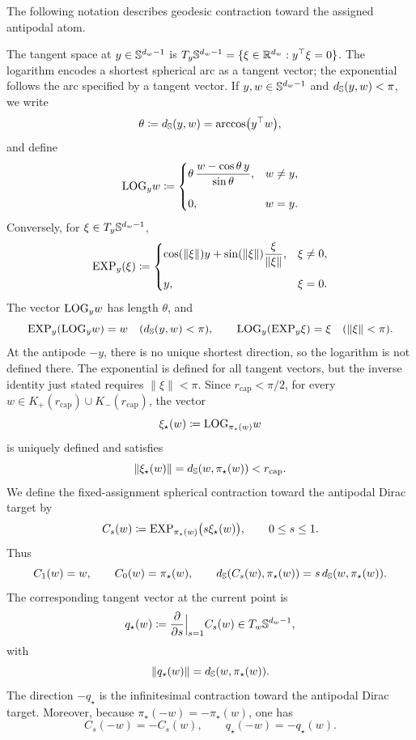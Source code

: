 The following notation describes geodesic contraction toward the assigned antipodal atom.
\begin{definition}
    \label{definition-spherical-logarithm-exponential}
The tangent space at \(y\in\mathbb{S}^{d_w-1}\) is
\(T_y\mathbb{S}^{d_w-1}=\{\xi\in\mathbb{R}^{d_w}:y^\top\xi=0\}\).
The logarithm encodes a shortest spherical arc as a tangent vector; the
exponential follows the arc specified by a tangent vector. If
\(y,w\in\mathbb{S}^{d_w-1}\) and \(d_{\mathbb{S}}(y,w)<\pi\), we write
\[
    \theta\coloneq d_{\mathbb{S}}(y,w)=\arccos(y^\top w),
\]
and define
\begin{equation}
\label{eq:mf-spherical-LOG}
    \mathrm{LOG}_y w
    \coloneq
    \begin{cases}
    \displaystyle
    \theta\,
    \frac{w-\cos\theta\,y}{\sin\theta},
    & w\neq y,\\[1.2em]
    0, & w=y.
    \end{cases}
\end{equation}
Conversely, for \(\xi\in T_y\mathbb{S}^{d_w-1}\),
\begin{equation}
\label{eq:mf-spherical-EXP}
    \mathrm{EXP}_y(\xi)
    \coloneq
    \begin{cases}
    \displaystyle
    \cos(\|\xi\|)y+
    \sin(\|\xi\|)\frac{\xi}{\|\xi\|},
    & \xi\neq0,\\[1.2em]
    y, & \xi=0.
    \end{cases}
\end{equation}
The vector \(\mathrm{LOG}_yw\) has length \(\theta\), and
\[
 \mathrm{EXP}_y(\mathrm{LOG}_yw)=w\quad(d_{\mathbb{S}}(y,w)<\pi),\qquad
 \mathrm{LOG}_y(\mathrm{EXP}_y\xi)=\xi\quad(\|\xi\|<\pi).
\]
At the antipode \(-y\), there is no unique shortest direction, so the
logarithm is not defined there. The exponential is defined for all tangent
vectors, but the inverse identity just stated requires \(\|\xi\|<\pi\).
Since \(r_{\mathrm{cap}}<\pi/2\), for every
\(w\in K_+(r_{\mathrm{cap}})\cup K_-(r_{\mathrm{cap}})\), the vector
\[
    \xi_\star(w)
    \coloneq
    \mathrm{LOG}_{\pi_\star(w)}w
\]
is uniquely defined and satisfies
\[
    \|\xi_\star(w)\|
    =
    d_{\mathbb{S}}(w,\pi_\star(w))
    <r_{\mathrm{cap}}.
\]
We define the fixed-assignment spherical contraction toward the antipodal Dirac target by
\[
    C_s(w)
    \coloneq
    \mathrm{EXP}_{\pi_\star(w)}\bigl(s\xi_\star(w)\bigr),
    \qquad
    0\le s\le1.
\]
Thus
\[
    C_1(w)=w,
    \qquad
    C_0(w)=\pi_\star(w),
    \qquad
    d_{\mathbb{S}}(C_s(w),\pi_\star(w))
    =s\,d_{\mathbb{S}}(w,\pi_\star(w)).
\]
The corresponding tangent vector at the current point is
\[
    q_\star(w)
    \coloneq
    \frac{\partial}{\partial s}\Big|_{s=1}C_s(w)
    \in T_w\mathbb{S}^{d_w-1},
\]
with
\[
    \|q_\star(w)\|=d_{\mathbb{S}}(w,\pi_\star(w)).
\]
The direction \(-q_\star\) is the infinitesimal contraction toward the antipodal Dirac target.
Moreover, because \(\pi_\star(-w)=-\pi_\star(w)\), one has
\[
    C_s(-w)=-C_s(w),
    \qquad
    q_\star(-w)=-q_\star(w).
\]
\end{definition}


